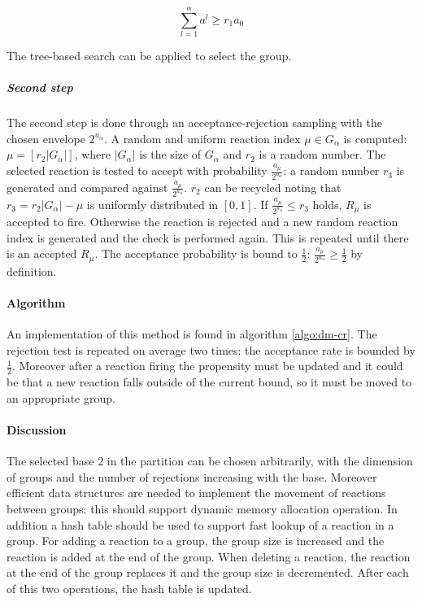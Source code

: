         $$\sum\limits_{l=1}^\alpha a^l\ge r_1a_0$$

        The tree-based search can be applied to select the group.

        \subparagraph{Second step}
        The second step is done through an acceptance-rejection sampling with the chosen envelope $2^{u_\alpha}$.
        A random and uniform reaction index $\mu\in G_\alpha$ is computed: $\mu = [r_2|G_\alpha|]$, where $|G_\alpha|$ is the size of $G_\alpha$ and $r_2$ is a random number.
        The selected reaction is tested to accept with probability $\frac{a_\mu}{2^{u_\alpha}}$: a random number $r_3$ is generated and compared against $\frac{a_\mu}{2^{u_\alpha}}$.
        $r_2$ can be recycled noting that $r_3 = r_2|G_\alpha|-\mu$ is uniformly distributed in $[0,1]$.
        If $\frac{a_\mu}{2^{u_\alpha}}\le r_3$ holds, $R_\mu$ is accepted to fire.
        Otherwise the reaction is rejected and a new random reaction index is generated and the check is performed again.
        This is repeated until there is an accepted $R_\mu$.
        The acceptance probability is bound to $\frac{1}{2}$: $\frac{a_\mu}{2^{u_\alpha}}\ge \frac{1}{2}$ by definition.

      \paragraph{Algorithm}
      An implementation of this method is found in algorithm \ref{algo:dm-cr}.
      The rejection test is repeated on average two times: the acceptance rate is bounded by $\frac{1}{2}$.
      Moreover after a reaction firing the propensity must be updated and it could be that a new reaction falls outside of the current bound, so it must be moved to an appropriate group.

      

      \paragraph{Discussion}
      The selected base $2$ in the partition can be chosen arbitrarily, with the dimension of groups and the number of rejections increasing with the base.
      Moreover efficient data structures are needed to implement the movement of reactions between groups: this should support dynamic memory allocation operation.
      In addition a hash table should be used to support fast lookup of a reaction in a group.
      For adding a reaction to a group, the group size is increased and the reaction is added at the end of the group.
      When deleting a reaction, the reaction at the end of the group replaces it and the group size is decremented.
      After each of this two operations, the hash table is updated.

